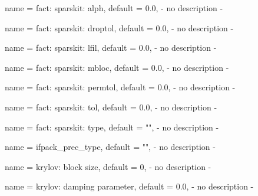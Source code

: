\begin{parameter}{
    name    = {fact: sparskit: alph},
    default = {0.0},
}
- no description -
\end{parameter}

\begin{parameter}{
    name    = {fact: sparskit: droptol},
    default = {0.0},
}
- no description -
\end{parameter}

\begin{parameter}{
    name    = {fact: sparskit: lfil},
    default = {0.0},
}
- no description -
\end{parameter}

\begin{parameter}{
    name    = {fact: sparskit: mbloc},
    default = {0.0},
}
- no description -
\end{parameter}

\begin{parameter}{
    name    = {fact: sparskit: permtol},
    default = {0.0},
}
- no description -
\end{parameter}

\begin{parameter}{
    name    = {fact: sparskit: tol},
    default = {0.0},
}
- no description -
\end{parameter}

\begin{parameter}{
    name    = {fact: sparskit: type},
    default = {""},
}
- no description -
\end{parameter}

\begin{parameter}{
    name    = {ifpack_prec_type},
    default = {""},
}
- no description -
\end{parameter}

\begin{parameter}{
    name    = {krylov: block size},
    default = {0},
}
- no description -
\end{parameter}

\begin{parameter}{
    name    = {krylov: damping parameter},
    default = {0.0},
}
- no description -
\end{parameter}

